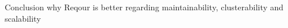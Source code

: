 \documentclass[../main.tex]{subfiles}
\begin{document}
Conclusion why Reqour is better regarding maintainability, clusterability and scalability
\end{document}
